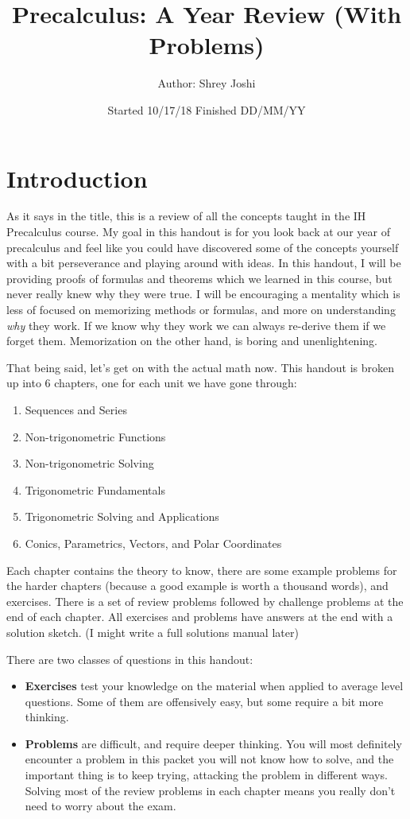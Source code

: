 \documentclass[a4paper]{article}
\title{Precalculus: A Year Review (With Problems)}
\author{Author: Shrey Joshi}
\date{Started 10/17/18 \quad \quad \quad Finished DD/MM/YY}
\begin{document}
\maketitle

\section{Introduction}
As it says in the title, this is a review of all the concepts taught in the IH Precalculus course. My goal in this handout is for you look back at our year of precalculus and feel like you could have discovered some of the concepts yourself with a bit perseverance and playing around with ideas. In this handout, I will be providing proofs of formulas and theorems which we learned in this course, but never really knew why they were true. I will be encouraging a mentality which is less of focused on memorizing methods or formulas, and more on understanding \textit{why} they work. If we know why they work we can always re-derive them if we forget them. Memorization on the other hand, is boring and unenlightening.

That being said, let's get on with the actual math now. This handout is broken up into 6 chapters, one for each unit we have gone through:
\begin{enumerate}
\item Sequences and Series
\item Non-trigonometric Functions
\item Non-trigonometric Solving
\item Trigonometric Fundamentals
\item Trigonometric Solving and Applications
\item Conics, Parametrics, Vectors, and Polar Coordinates
\end{enumerate}
Each chapter contains the theory to know, there are some example problems for the harder chapters (because a good example is worth a thousand words), and exercises. There is a set of review problems followed by challenge problems at the end of each chapter. All exercises and problems have answers at the end with a solution sketch. (I might write a full solutions manual later)

There are two classes of questions in this handout:
\begin{itemize}
    \item \textbf{Exercises} test your knowledge on the material when applied to average level questions. Some of them are offensively easy, but some require a bit more thinking.
    \item \textbf{Problems} are difficult, and require deeper thinking. You will most definitely encounter a problem in this packet you will not know how to solve, and the important thing is to keep trying, attacking the problem in different ways. Solving most of the review problems in each chapter means you really don't need to worry about the exam.
\end{itemize}
\end{document}
